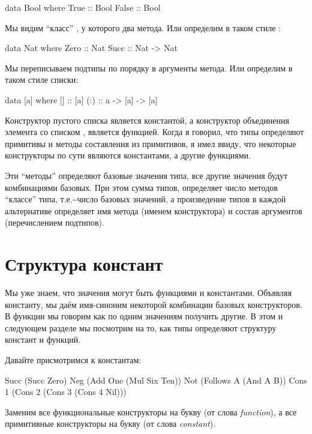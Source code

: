 \begin{code}
data Bool where
    True  :: Bool
    False :: Bool
\end{code}

Мы видим ``класс'' , у которого два метода. Или определим в
таком стиле :


\begin{code}
data Nat where
    Zero  :: Nat
    Succ  :: Nat -> Nat
\end{code}

Мы переписываем подтипы по порядку в аргументы метода. Или определим в
таком стиле списки:


\begin{code}
data [a] where
    []   :: [a]
    (:)  :: a -> [a] -> [a] 
\end{code}

Конструктор пустого списка \In{[]} является константой, а конструктор
объединения элемента со списком \In{(:)}, является функцией. Когда я
говорил, что типы определяют примитивы и методы составления из
примитивов, я имел ввиду, что некоторые конструкторы по сути являются
константами, а другие функциями.

Эти ``методы'' определяют базовые значения типа, все другие значения
будут комбинациями базовых. При этом сумма типов, определяет число
методов ``классе'' типа, т.е.\textasciitilde{}число базовых значений, а
произведение типов в каждой альтернативе определяет имя метода (именем
конструктора) и состав аргументов (перечислением подтипов).

\section{Структура констант}

Мы уже знаем, что значения могут быть функциями и константами. Объявляя
константу, мы даём имя-синоним некоторой комбинации базовых
конструкторов. В функции мы говорим как по одним значениям получить
другие. В этом и следующем разделе мы посмотрим на то, как типы
определяют структуру констант и функций.

Давайте присмотримся к константам:


\begin{code}
Succ (Succ Zero)
Neg (Add One (Mul Six Ten))
Not (Follows A (And A B))
Cons 1 (Cons 2 (Cons 3 (Cons 4 Nil)))
\end{code}

Заменим все функциональные конструкторы на букву  (от слова
\emph{function}), а все примитивные конструкторы на букву  (от
слова \emph{constant}).


